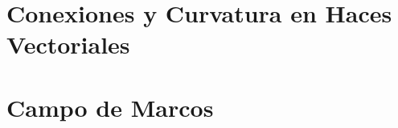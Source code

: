 \documentclass[10pt, letterpaper, spanish]{book}
\theoremstyle{definition}
\theoremstyle{plain}
\theoremstyle{remark}
\theoremstyle{break}
\begin{document}

\appendix

\chapter{Conexiones y Curvatura en Haces Vectoriales}


\chapter{Campo de Marcos}



\newpage





\printindex{}
\end{document}
